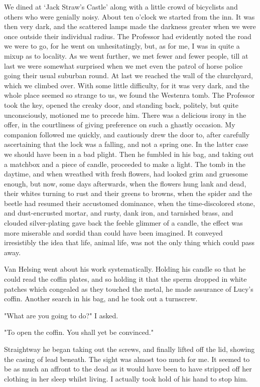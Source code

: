 We dined at `Jack Straw's Castle' along with a little crowd of bicyclists and others who were genially noisy. About ten o'clock we started from the inn. It was then very dark, and the scattered lamps made the darkness greater when we were once outside their individual radius. The Professor had evidently noted the road we were to go, for he went on unhesitatingly, but, as for me, I was in quite a mixup as to locality. As we went further, we met fewer and fewer people, till at last we were somewhat surprised when we met even the patrol of horse police going their usual suburban round. At last we reached the wall of the churchyard, which we climbed over. With some little difficulty, for it was very dark, and the whole place seemed so strange to us, we found the Westenra tomb. The Professor took the key, opened the creaky door, and standing back, politely, but quite unconsciously, motioned me to precede him. There was a delicious irony in the offer, in the courtliness of giving preference on such a ghastly occasion. My companion followed me quickly, and cautiously drew the door to, after carefully ascertaining that the lock was a falling, and not a spring one. In the latter case we should have been in a bad plight. Then he fumbled in his bag, and taking out a matchbox and a piece of candle, proceeded to make a light. The tomb in the daytime, and when wreathed with fresh flowers, had looked grim and gruesome enough, but now, some days afterwards, when the flowers hung lank and dead, their whites turning to rust and their greens to browns, when the spider and the beetle had resumed their accustomed dominance, when the time-discolored stone, and dust-encrusted mortar, and rusty, dank iron, and tarnished brass, and clouded silver-plating gave back the feeble glimmer of a candle, the effect was more miserable and sordid than could have been imagined. It conveyed irresistibly the idea that life, animal life, was not the only thing which could pass away. 

Van Helsing went about his work systematically. Holding his candle so that he could read the coffin plates, and so holding it that the sperm dropped in white patches which congealed as they touched the metal, he made assurance of Lucy's coffin. Another search in his bag, and he took out a turnscrew. 

"What are you going to do?" I asked. 

"To open the coffin. You shall yet be convinced." 

Straightway he began taking out the screws, and finally lifted off the lid, showing the casing of lead beneath. The sight was almost too much for me. It seemed to be as much an affront to the dead as it would have been to have stripped off her clothing in her sleep whilst living. I actually took hold of his hand to stop him. 

